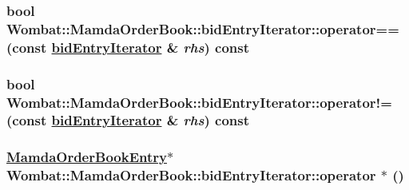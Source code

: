 \hypertarget{classWombat_1_1MamdaOrderBook_1_1bidEntryIterator_632e553b605c428db7ce2e6817b2318f}{
\subsubsection[operator==]{\setlength{\rightskip}{0pt plus 5cm}bool Wombat::Mamda\-Order\-Book::bid\-Entry\-Iterator::operator== (const \hyperlink{classWombat_1_1MamdaOrderBook_1_1bidEntryIterator}{bid\-Entry\-Iterator} \& {\em rhs}) const}}
\label{classWombat_1_1MamdaOrderBook_1_1bidEntryIterator_632e553b605c428db7ce2e6817b2318f}


\hypertarget{classWombat_1_1MamdaOrderBook_1_1bidEntryIterator_f036e5ee7bf309762560ba30ef4c4dd9}{
\subsubsection[operator"!=]{\setlength{\rightskip}{0pt plus 5cm}bool Wombat::Mamda\-Order\-Book::bid\-Entry\-Iterator::operator!= (const \hyperlink{classWombat_1_1MamdaOrderBook_1_1bidEntryIterator}{bid\-Entry\-Iterator} \& {\em rhs}) const}}
\label{classWombat_1_1MamdaOrderBook_1_1bidEntryIterator_f036e5ee7bf309762560ba30ef4c4dd9}


\hypertarget{classWombat_1_1MamdaOrderBook_1_1bidEntryIterator_750f4cd3d8a71fd104995d77c7793bda}{
\subsubsection[operator $\ast$]{\setlength{\rightskip}{0pt plus 5cm}\hyperlink{classWombat_1_1MamdaOrderBookEntry}{Mamda\-Order\-Book\-Entry}$\ast$ Wombat::Mamda\-Order\-Book::bid\-Entry\-Iterator::operator $\ast$ ()}}
\label{classWombat_1_1MamdaOrderBook_1_1bidEntryIterator_750f4cd3d8a71fd104995d77c7793bda}



